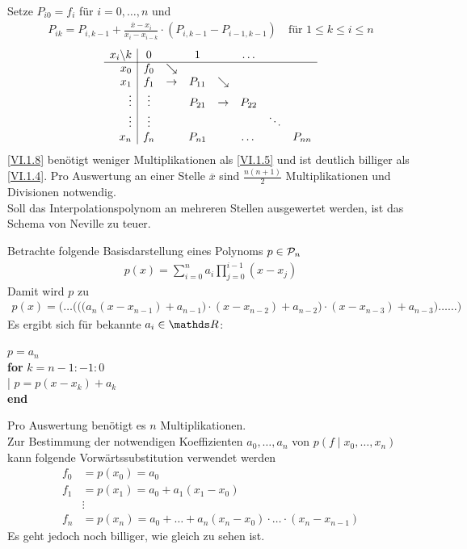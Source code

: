 Setze $P_{i0} = f_i$ für $i=0, \dots , n$ und
\begin{gather}
  P_{ik} = P_{i,k-1}+\frac{\overline{x}-x_i}{x_i-x_{i-k}}
  \cdot \left( P_{i,k-1}-P_{i-1,k-1}\right)
  \quad \text{für } 1\leq k\leq i\leq n
  \label{VI.1.8}
\end{gather}
\begin{gather*}
  \begin{array}{r|cccccccccc}
    x_i\backslash k & 0 && 1 && \dots \\
    \cline{1-8}
    x_0 & f_0 & \searrow\\
    x_1 & f_1 & \rightarrow & P_{11}&\searrow\\
    \vdots & \vdots && P_{21} &\rightarrow& P_{22} \\
    \vdots  & \vdots && && &\ddots \\
    x_n & f_n && P_{n1} && \dots &&  P_{nn}
  \end{array}
\end{gather*}
\eqref{VI.1.8} benötigt weniger Multiplikationen als 
\eqref{VI.1.5} und ist deutlich billiger als
\eqref{VI.1.4}.
Pro Auswertung an einer Stelle $\overline{x}$ sind
$\frac{n(n+1)}{2}$ Multiplikationen und Divisionen notwendig.\\
Soll das Interpolationspolynom an mehreren Stellen ausgewertet werden,
ist das Schema von Neville zu teuer.

Betrachte folgende Basisdarstellung eines Polynoms $p\in\mathcal{P}_n$
\begin{align}
  p(x) = \sum_{i=0}^{n}a_i \prod_{j=0}^{i-1} (x-x_j)
  \label{VI.1.9}
\end{align} 
Damit wird $p$ zu 
\begin{gather}
  p(x)= \Bigg(\dots \bigg(\Big(
  \big(a_n(x-x_{n-1})+a_{n-1}\big)\cdot(x-x_{n-2})+a_{n-2}\Big)
  \cdot (x-x_{n-3})+a_{n-3}\bigg) \dots\dots\Bigg)
  \label{VI.1.10}
\end{gather}
Es ergibt sich für bekannte $a_i\in\R$:

\begin{pseudocode}{6cm}
  $p=a_n$ \\
  \textbf{for} $k=n-1:-1:0$\\
  |\>  $p=p(x-x_k)+a_k$\\
  \textbf{end}
\end{pseudocode}

Pro Auswertung benötigt es $n$ Multiplikationen.\\
Zur Bestimmung der notwendigen Koeffizienten $a_0, \dots, a_n$
von $p(f\mid  x_0, \dots , x_n)$ kann folgende 
Vorwärtssubstitution verwendet werden
\begin{align*}
  f_0 &= p(x_0) = a_0\\
  f_1 &= p(x_1) = a_0+a_1(x_1-x_0)\\
      &\vdots\\
  f_n &=p(x_n) = a_0 + \dots + a_n(x_n-x_0)\cdot\dots\cdot(x_n-x_{n-1})
\end{align*}
Es geht jedoch noch billiger, wie gleich zu sehen ist.

